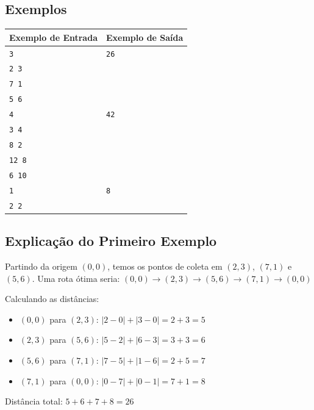 \subsection*{Exemplos}

\begin{center}
\begin{tabular}{|p{6cm}|p{4cm}|}
\hline
\textbf{Exemplo de Entrada} & \textbf{Exemplo de Saída} \\
\hline
\texttt{3} & \texttt{26} \\
\texttt{2 3} & \\
\texttt{7 1} & \\
\texttt{5 6} & \\
\hline
\texttt{4} & \texttt{42} \\
\texttt{3 4} & \\
\texttt{8 2} & \\
\texttt{12 8} & \\
\texttt{6 10} & \\
\hline
\texttt{1} & \texttt{8} \\
\texttt{2 2} & \\
\hline
\end{tabular}
\end{center}

\subsection*{Explicação do Primeiro Exemplo}

Partindo da origem $(0,0)$, temos os pontos de coleta em $(2,3)$, $(7,1)$ e $(5,6)$.
Uma rota ótima seria:
$(0,0) \rightarrow (2,3) \rightarrow (5,6) \rightarrow (7,1) \rightarrow (0,0)$

Calculando as distâncias:
\begin{itemize}
    \item $(0,0)$ para $(2,3)$: $|2-0| + |3-0| = 2 + 3 = 5$
    \item $(2,3)$ para $(5,6)$: $|5-2| + |6-3| = 3 + 3 = 6$
    \item $(5,6)$ para $(7,1)$: $|7-5| + |1-6| = 2 + 5 = 7$
    \item $(7,1)$ para $(0,0)$: $|0-7| + |0-1| = 7 + 1 = 8$
\end{itemize}

Distância total: $5 + 6 + 7 + 8 = 26$


\newpage

\begin{center}
\noindent

\end{center}